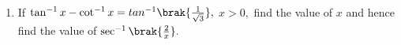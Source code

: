 
\begin{enumerate}

 \item If $\tan^{-1} x - \cot^{-1} x= tan^{-1}\brak{\frac{1}{\sqrt{3}}},$ $x > 0,$ find the value of $x$ and hence find the value of $\sec^{-1}\brak{\frac{2}{x}}.$

    
 \end{enumerate}
